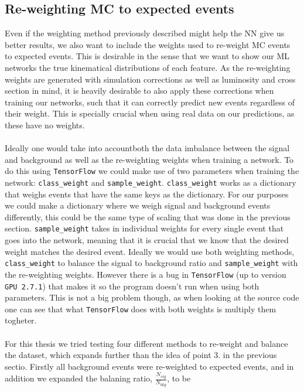 \documentclass[14pt, a4paper]{book}
\begin{document}
\subsection{Re-weighting MC to expected events}\label{sec:sample_wgts_NN}
Even if the weighting method previously described might help the NN give us better results, we also want to include the weights used to re-weight MC events to expected events. This is desirable in the sense that we want to show our ML networks the true kinematical distributions of each feature.
As the re-weighting weights are generated with simulation corrections as well as luminosity and cross section in mind, it is heavily desirable to also apply these corrections when training our networks, such that it can correctly predict new events regardless of their weight. This is specially 
crucial when using real data on our predictions, as these have no weights.\\
\\Ideally one would take into accountboth  the data imbalance between the signal and background as well as the re-weighting weights when training a network. To do this using \verb|TensorFlow| we could make use of two parameters when training the network: \verb|class_weight| and \verb|sample_weight|. 
\verb|class_weight| works as a dictionary that weighs events that have the same keys as the dictionary. For our purposes we could make a dictionary where we weigh signal and background events differently, this could be the same type of scaling that was done in the previous section. 
\verb|sample_weight| takes in individual weights for every single event that goes into the network, meaning that it is crucial that we know that the desired weight matches the desired event. Ideally we would use both weighting methods, \verb|class_weight| to balance the signal to 
background ratio and \verb|sample_weight| with the re-weighting weights. However there is a bug in \verb|TensorFlow| (up to version \verb|GPU 2.7.1|) that makes it so the program doesn't run when using both parameters. This is not a big problem though, as when looking at the source code \cite{Keras_source_code} 
one can see that what \verb|TensorFlow| does with both weights is multiply them togheter. \\
\\For this thesis we tried testing four different methods to re-weight and balance the dataset, which expands further than the idea of point 3. in the previous sectio. Firstly all background events were re-weighted to expected events, and in addition we expanded the balaning ratio, $\frac{N_{sig}}{N_{bkg}}$, to be
\end{document}
